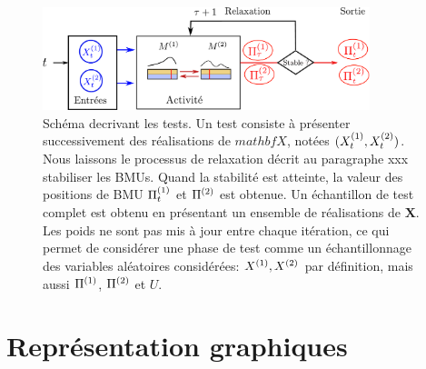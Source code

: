 \begin{figure}
\centering
\includegraphics[width=0.85\textwidth]{tests_2maps.pdf}
\caption{Schéma decrivant les tests. Un test consiste à présenter successivement des réalisations de $mathbf{X}$, notées $(X^{({1})}_t,X^{({2})}_t)$. Nous laissons le processus de relaxation décrit au paragraphe xxx stabiliser les BMUs. Quand la stabilité est atteinte, la valeur des positions de BMU $\Pi^{({1})}_t$ et $\Pi^{({2})}$ est obtenue. Un échantillon de test complet est obtenu en présentant un ensemble de réalisations de $\mathbf{X}$. Les poids ne sont pas mis à jour entre chaque itération, ce qui permet de considérer une phase de test comme un échantillonnage des variables aléatoires considérées: $X^{({1})},X^{({2})}$ par définition, mais aussi $\Pi^{({1})}$, $\Pi^{({2})}$ et $U$.}
\label{fig:flowchart}
\end{figure}


\section{Représentation graphiques}

